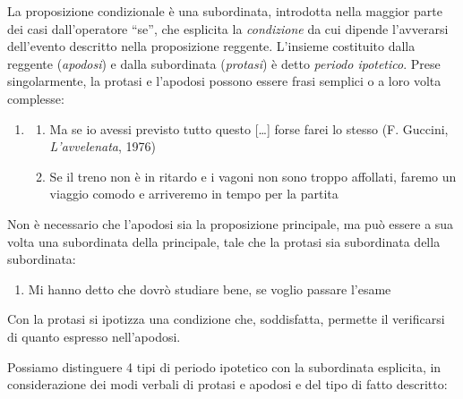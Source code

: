 \documentclass[
  a4paper,
  twoside,
  11pt,
  chapterprefix=false,
  bibliography=totocnumbered,
  listof=flat]{scrbook}
\providecommand{\tightlist}{%
  \setlength{\itemsep}{0pt}\setlength{\parskip}{0pt}}
\begin{document}
La proposizione condizionale è una subordinata, introdotta nella maggior parte dei casi dall'operatore \enquote{se}, che esplicita la \emph{condizione} da cui dipende l'avverarsi dell'evento descritto nella proposizione reggente. L'insieme costituito dalla reggente (\emph{apodosi}) e dalla subordinata (\emph{protasi}) è detto \emph{periodo ipotetico}. Prese singolarmente, la protasi e l'apodosi possono essere frasi semplici o a loro volta complesse:

\begin{enumerate}
\def\labelenumi{(\arabic{enumi})}
\setcounter{enumi}{82}
\item
  \begin{enumerate}
  \def\labelenumii{\alph{enumii}.}
  \tightlist
  \item
    Ma se io avessi previsto tutto questo {[}\ldots{]} forse farei lo stesso (F. Guccini, \emph{L'avvelenata}, 1976)
  \item
    Se il treno non è in ritardo e i vagoni non sono troppo affollati, faremo un viaggio comodo e arriveremo in tempo per la partita
  \end{enumerate}
\end{enumerate}

Non è necessario che l'apodosi sia la proposizione principale, ma può essere a sua volta una subordinata della principale, tale che la protasi sia subordinata della subordinata:

\begin{enumerate}
\def\labelenumi{(\arabic{enumi})}
\setcounter{enumi}{83}
\tightlist
\item
  Mi hanno detto che dovrò studiare bene, se voglio passare l'esame
\end{enumerate}

Con la protasi si ipotizza una condizione che, soddisfatta, permette il verificarsi di quanto espresso nell'apodosi.

Possiamo distinguere 4 tipi di periodo ipotetico con la subordinata esplicita, in considerazione dei modi verbali di protasi e apodosi e del tipo di fatto descritto:
\end{document}
